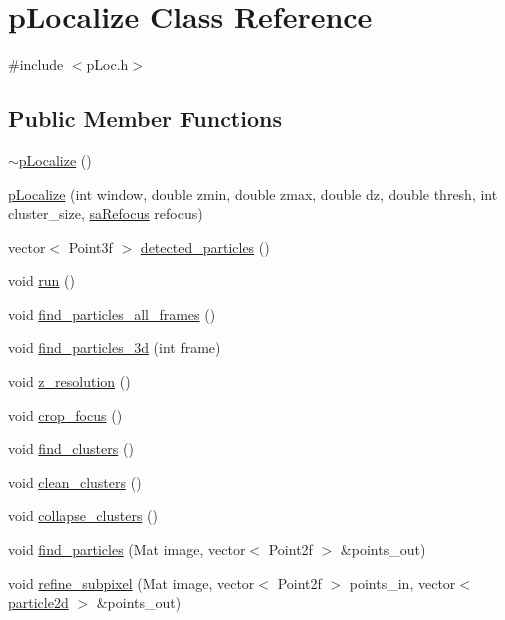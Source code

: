 \hypertarget{classpLocalize}{\section{p\-Localize Class Reference}
\label{dc/d52/classpLocalize}
}


{\ttfamily \#include $<$p\-Loc.\-h$>$}

\subsection*{Public Member Functions}
\begin{DoxyCompactItemize}
\item 
\hyperlink{classpLocalize_a3ce8450a0df2f8b9f29c12a81bed13c2}{$\sim$p\-Localize} ()
\item 
\hyperlink{classpLocalize_a8128f9e9d96089c828c07e9ab8421aef}{p\-Localize} (int window, double zmin, double zmax, double dz, double thresh, int cluster\-\_\-size, \hyperlink{classsaRefocus}{sa\-Refocus} refocus)
\item 
vector$<$ Point3f $>$ \hyperlink{classpLocalize_a9fd130c559d3a8898099c30e31f77771}{detected\-\_\-particles} ()
\item 
void \hyperlink{classpLocalize_a2f6b7bfcf42e3bb54b078a9b3428129a}{run} ()
\item 
void \hyperlink{classpLocalize_a80d8c3af8922b89126c6b09f2abaa9f3}{find\-\_\-particles\-\_\-all\-\_\-frames} ()
\item 
void \hyperlink{classpLocalize_a4cc93f868df86be24d561fe2696d073a}{find\-\_\-particles\-\_\-3d} (int frame)
\item 
void \hyperlink{classpLocalize_ab06316bae1ab16dc89bd112b917885d6}{z\-\_\-resolution} ()
\item 
void \hyperlink{classpLocalize_a9d17b81e6a0dd34934cc346bd9bd28ea}{crop\-\_\-focus} ()
\item 
void \hyperlink{classpLocalize_a63631962bf0b5e61a7bbfc9f6bed425d}{find\-\_\-clusters} ()
\item 
void \hyperlink{classpLocalize_a4fef0d0f6bbb23762eda12a34b996d88}{clean\-\_\-clusters} ()
\item 
void \hyperlink{classpLocalize_afe6e3a6ed7df1d57ba5d27bf32847db0}{collapse\-\_\-clusters} ()
\item 
void \hyperlink{classpLocalize_ad0b19ddc9f1bf90737c34ec1370e272d}{find\-\_\-particles} (Mat image, vector$<$ Point2f $>$ \&points\-\_\-out)
\item 
void \hyperlink{classpLocalize_a331d6a8b9d616de899133c7bbc8878f5}{refine\-\_\-subpixel} (Mat image, vector$<$ Point2f $>$ points\-\_\-in, vector$<$ \hyperlink{structparticle2d}{particle2d} $>$ \&points\-\_\-out)

\end{DoxyCompactItemize}
